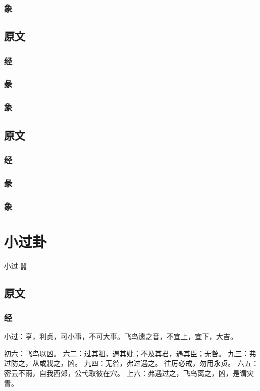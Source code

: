 \documentclass[12pt,oneside]{book}
\begin{document}
\subsection{象}

\section{原文}
\subsection{经}
\subsection{彖}
\subsection{象}

\section{原文}
\subsection{经}
\subsection{彖}
\subsection{象}

\chapter{小过卦}
小过 ䷽

\section{原文}

\subsection{经}
小过：亨，利贞，可小事，不可大事。飞鸟遗之音，不宜上，宜下，大吉。

初六：飞鸟以凶。
六二：过其祖，遇其妣；不及其君，遇其臣；无咎。
九三：弗过防之，从或戕之，凶。
九四：无咎，弗过遇之。 往厉必戒，勿用永贞。
六五：密云不雨，自我西郊，公弋取彼在穴。
上六：弗遇过之，飞鸟离之，凶，是谓灾眚。
\end{document}
